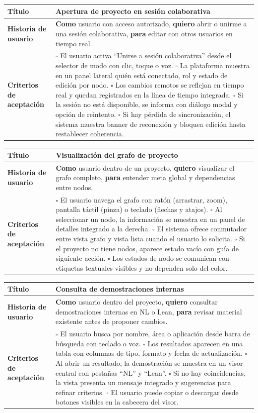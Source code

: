 \documentclass{article}
\newcommand{\story}[3]{
\begin{table}[H]
    \centering
    \begin{tabularx}{\textwidth}{| >{\raggedright\arraybackslash\bfseries\columncolor{leftheaderbg}}p{2.5cm} | >{\raggedright\arraybackslash\columncolor{contentbg}}X |}
        \hline
        Título & #1 \\
        \hline
        Historia de usuario & #2 \\
        \hline
        Criterios de aceptación & #3 \\
        \hline
    \end{tabularx}
\end{table}
}
\begin{document}
\story
{Apertura de proyecto en sesión colaborativa}
{\textbf{Como} usuario con acceso autorizado, \textbf{quiero} abrir o unirme a una sesión colaborativa, \textbf{para} editar con otros usuarios en tiempo real.}
{$\square$ El usuario activa ``Unirse a sesión colaborativa'' desde el selector de modo con clic, toque o voz. \newline
$\square$ La plataforma muestra en un panel lateral quién está conectado, rol y estado de edición por nodo. \newline
$\square$ Los cambios remotos se reflejan en tiempo real y quedan registrados en la línea de tiempo integrada. \newline
$\square$ Si la sesión no está disponible, se informa con diálogo modal y opción de reintento. \newline
$\square$ Si hay pérdida de sincronización, el sistema muestra banner de reconexión y bloquea edición hasta restablecer coherencia.}

\story
{Visualización del grafo de proyecto}
{\textbf{Como} usuario dentro de un proyecto, \textbf{quiero} visualizar el grafo completo, \textbf{para} entender meta global y dependencias entre nodos.}
{$\square$ El usuario navega el grafo con ratón (arrastrar, zoom), pantalla táctil (pinza) o teclado (flechas y atajos). \newline
$\square$ Al seleccionar un nodo, la información se muestra en un panel de detalles integrado a la derecha. \newline
$\square$ El sistema ofrece conmutador entre vista grafo y vista lista cuando el usuario lo solicita. \newline
$\square$ Si el proyecto no tiene nodos, aparece estado vacío con guía de siguiente acción. \newline
$\square$ Los estados de nodo se comunican con etiquetas textuales visibles y no dependen solo del color.}

\story
{Consulta de demostraciones internas}
{\textbf{Como} usuario dentro del proyecto, \textbf{quiero} consultar demostraciones internas en NL o Lean, \textbf{para} revisar material existente antes de proponer cambios.}
{$\square$ El usuario busca por nombre, área o aplicación desde barra de búsqueda con teclado o voz. \newline
$\square$ Los resultados aparecen en una tabla con columnas de tipo, formato y fecha de actualización. \newline
$\square$ Al abrir un resultado, la demostración se muestra en un visor central con pestañas ``NL'' y ``Lean''. \newline
$\square$ Si no hay coincidencias, la vista presenta un mensaje integrado y sugerencias para refinar criterios. \newline
$\square$ El usuario puede copiar o descargar desde botones visibles en la cabecera del visor.}
\end{document}
